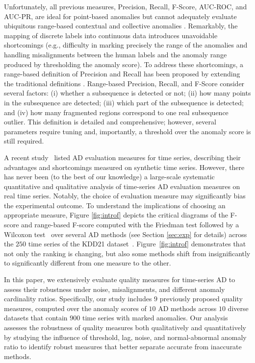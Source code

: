Unfortunately, all previous measures, Precision, Recall, F-Score, AUC-ROC, and AUC-PR, are ideal for point-based anomalies but cannot adequately evaluate ubiquitous range-based contextual and collective anomalies \cite{blazquez2021review}. Remarkably, the mapping of discrete labels into continuous data introduces unavoidable shortcomings (e.g., difficulty in marking precisely the range of the anomalies and handling misalignments between the human labels and the anomaly range produced by thresholding the anomaly score). To address these shortcomings, a range-based definition of Precision and Recall has been proposed by extending the traditional definitions \cite{tatbul_precision_2018}. Range-based Precision, Recall, and F-Score consider several factors: (i) whether a subsequence is detected or not; (ii) how many points in the subsequence are detected; (iii) which part of the subsequence is detected; and (iv) how many fragmented regions correspond to one real subsequence outlier. This definition is detailed and comprehensive; however, several parameters require tuning and, importantly, a threshold over the anomaly score is still required.

A recent study~\cite{DBLP:journals/corr/abs-2303-01272} listed AD evaluation measures for time series, describing their advantages and shortcomings measured on synthetic time series. However, there has never been (to the best of our knowledge) a large-scale systematic quantitative and qualitative analysis of time-series AD evaluation measures on real time series. Notably, the choice of evaluation measure may significantly bias the experimental outcome. To understand the implications of choosing an appropriate measure, Figure \ref{fig:introf} depicts the critical diagrams of the F-score and range-based F-score computed with the Friedman test followed by a Wilcoxon test~\cite{10.2307/3001968} over several AD methods (see Section \ref{sec:exp} for details) across the $250$ time series of the KDD21 dataset~\cite{kdd}. Figure~\ref{fig:introf} demonstrates that not only the ranking is changing, but also some methods shift from insignificantly to significantly different from one measure to the other. 



In this paper, we extensively evaluate quality measures for time-series AD to assess their robustness under noise, misalignments, and different anomaly cardinality ratios. Specifically, our study includes $9$ previously proposed quality measures, computed over the anomaly scores of $10$ AD methods across $10$ diverse datasets that contain $900$ time series with marked anomalies. Our analysis assesses the robustness of quality measures both qualitatively and quantitatively by studying the influence of threshold, lag, noise, and normal-abnormal anomaly ratio to identify robust measures that better separate accurate from inaccurate methods. 


